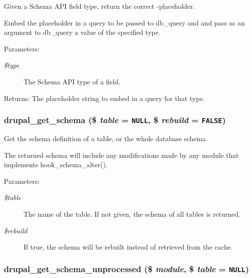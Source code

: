 Given a Schema API field type, return the correct -placeholder.

Embed the placeholder in a query to be passed to db\_\-query and and pass as an argument to db\_\-query a value of the specified type.

\begin{Desc}
\item[Parameters:]
\begin{description}
\item[{\em \$type}]The Schema API type of a field. \end{description}
\end{Desc}
\begin{Desc}
\item[Returns:]The placeholder string to embed in a query for that type. \end{Desc}
\hypertarget{group__schemaapi_g979670bd6bd2e34337ffc5f0810f2d71}{
\subsubsection[{drupal\_\-get\_\-schema}]{\setlength{\rightskip}{0pt plus 5cm}drupal\_\-get\_\-schema (\$ {\em table} = {\tt NULL}, \/  \$ {\em rebuild} = {\tt FALSE})}}
\label{group__schemaapi_g979670bd6bd2e34337ffc5f0810f2d71}


Get the schema definition of a table, or the whole database schema.

The returned schema will include any modifications made by any module that implements hook\_\-schema\_\-alter().

\begin{Desc}
\item[Parameters:]
\begin{description}
\item[{\em \$table}]The name of the table. If not given, the schema of all tables is returned. \item[{\em \$rebuild}]If true, the schema will be rebuilt instead of retrieved from the cache. \end{description}
\end{Desc}
\hypertarget{group__schemaapi_gecb0d63f03b96dd1426298804e091d3b}{
\subsubsection[{drupal\_\-get\_\-schema\_\-unprocessed}]{\setlength{\rightskip}{0pt plus 5cm}drupal\_\-get\_\-schema\_\-unprocessed (\$ {\em module}, \/  \$ {\em table} = {\tt NULL})}}
\label{group__schemaapi_gecb0d63f03b96dd1426298804e091d3b}


